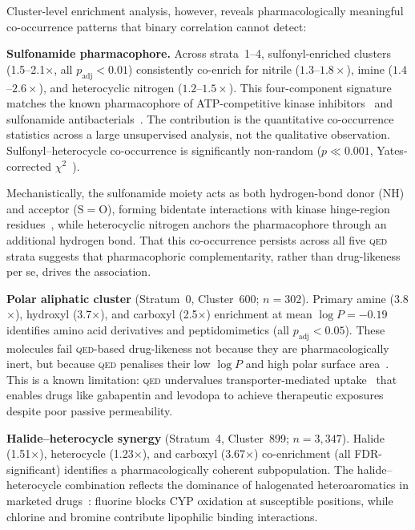 \documentclass[10pt,a4paper,twocolumn]{article}
\providecommand{\qed}{}
\let\qed\relax
\newcommand{\qedscore}{\textsc{qed}}
\let\qed\qedscore
\newcommand{\logp}{\ensuremath{\log P}}
\begin{document}
Cluster-level enrichment analysis, however, reveals pharmacologically meaningful co-occurrence patterns that binary correlation cannot detect:

\textbf{Sulfonamide pharmacophore.} Across strata~1--4, sulfonyl-enriched clusters (1.5--2.1$\times$, all $p_{\mathrm{adj}} < 0.01$) consistently co-enrich for nitrile ($1.3$--$1.8\times$), imine ($1.4$--$2.6\times$), and heterocyclic nitrogen ($1.2$--$1.5\times$). This four-component signature matches the known pharmacophore of ATP-competitive kinase inhibitors~\cite{roskoski2016} and sulfonamide antibacterials~\cite{supuran2017}. The contribution is the quantitative co-occurrence statistics across a large unsupervised analysis, not the qualitative observation. Sulfonyl--heterocycle co-occurrence is significantly non-random ($p \ll 0.001$, Yates-corrected $\chi^2$~\cite{yates1934}).

Mechanistically, the sulfonamide moiety acts as both hydrogen-bond donor (NH) and acceptor ($\mathrm{S}{=}\mathrm{O}$), forming bidentate interactions with kinase hinge-region residues~\cite{zuccotto2010}, while heterocyclic nitrogen anchors the pharmacophore through an additional hydrogen bond. That this co-occurrence persists across all five \qed{} strata suggests that pharmacophoric complementarity, rather than drug-likeness per se, drives the association.

\textbf{Polar aliphatic cluster} (Stratum~0, Cluster~600; $n = 302$). Primary amine (3.8$\times$), hydroxyl (3.7$\times$), and carboxyl (2.5$\times$) enrichment at mean $\logp{} = -0.19$ identifies amino acid derivatives and peptidomimetics (all $p_{\mathrm{adj}} < 0.05$). These molecules fail \qed{}-based drug-likeness not because they are pharmacologically inert, but because \qed{} penalises their low $\logp{}$ and high polar surface area~\cite{bickerton2012}. This is a known limitation: \qed{} undervalues transporter-mediated uptake~\cite{pardridge2012} that enables drugs like gabapentin and levodopa to achieve therapeutic exposures despite poor passive permeability.

\textbf{Halide--heterocycle synergy} (Stratum~4, Cluster~899; $n = 3{,}347$). Halide (1.51$\times$), heterocycle (1.23$\times$), and carboxyl (3.67$\times$) co-enrichment (all FDR-significant) identifies a pharmacologically coherent subpopulation. The halide--heterocycle combination reflects the dominance of halogenated heteroaromatics in marketed drugs~\cite{gillis2015}: fluorine blocks CYP oxidation at susceptible positions, while chlorine and bromine contribute lipophilic binding interactions.
\end{document}
